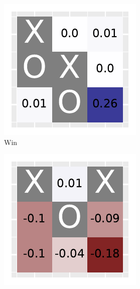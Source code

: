 \documentclass[10pt]{IEEEtran}
\begin{document}
\begin{figure}[h]
     \centering
     \begin{subfigure}[t]{0.32\linewidth}
         \centering
         \includegraphics[width=\linewidth]{code/figures/heatmap_0.pdf}
         \caption{Win}
         \label{fig_heatmap_1}
     \end{subfigure}
     \hfill
     \begin{subfigure}[t]{0.32\linewidth}
         \centering
         \includegraphics[width=\linewidth]{code/figures/heatmap_1.pdf}

\end{subfigure}
\end{figure}
\end{document}
